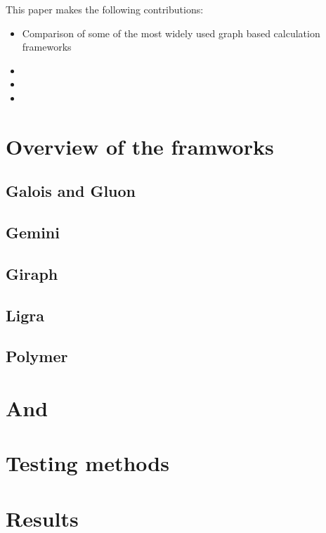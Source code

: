\documentclass[conference,a4paper]{IEEEtran}
\begin{document}
This paper makes the following contributions:
\begin{itemize}
  \item Comparison of some of the most widely used graph based calculation frameworks
  \item
  \item
  \item
\end{itemize}

\section{Overview of the framworks}
\subsection{Galois and Gluon}


\subsection{Gemini}


\subsection{Giraph}


\subsection{Ligra}


\subsection{Polymer}



\section{And}

\section{Testing methods}


\section{Results}

\end{document}
